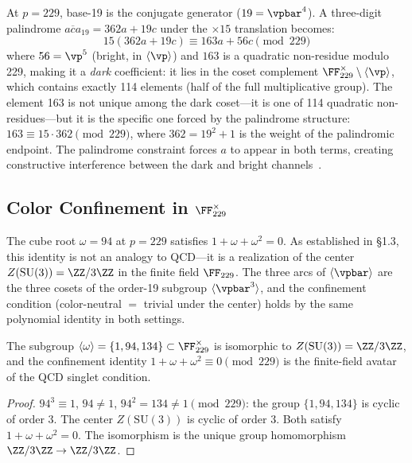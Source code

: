 At $p = 229$, base-19 is the conjugate generator ($19 = \vpbar^4$). A three-digit palindrome $\overline{aca}_{19} = 362a + 19c$ under the $\times 15$ translation becomes:
\[
15(362a + 19c) \equiv 163a + 56c \pmod{229}
\]
where $56 = \vp^5$ (bright, in $\langle \vp \rangle$) and $163$ is a quadratic non-residue modulo 229, making it a \emph{dark} coefficient: it lies in the coset complement $\FF_{229}^\times \setminus \langle \vp \rangle$, which contains exactly 114 elements (half of the full multiplicative group). The element 163 is not unique among the dark coset---it is one of 114 quadratic non-residues---but it is the specific one forced by the palindrome structure: $163 \equiv 15 \cdot 362 \pmod{229}$, where $362 = 19^2 + 1$ is the weight of the palindromic endpoint. The palindrome constraint forces $a$ to appear in both terms, creating constructive interference between the dark and bright channels~\cite{larue_chromatic}.

\subsection{Color Confinement in $\FF_{229}^\times$}

The cube root $\omega = 94$ at $p = 229$ satisfies $1 + \omega + \omega^2 = 0$. As established in \S1.3, this identity is not an analogy to QCD---it is a realization of the center $Z(\mathrm{SU}(3)) = \ZZ/3\ZZ$ in the finite field $\FF_{229}$. The three arcs of $\langle \vpbar \rangle$ are the three cosets of the order-19 subgroup $\langle \vpbar^3 \rangle$, and the confinement condition (color-neutral $=$ trivial under the center) holds by the same polynomial identity in both settings.

\begin{theorem}[Center Realization at $p = 229$]\label{thm:center_229}
The subgroup $\langle \omega \rangle = \{1, 94, 134\} \subset \FF_{229}^\times$ is isomorphic to $Z(\mathrm{SU}(3)) = \ZZ/3\ZZ$, and the confinement identity $1 + \omega + \omega^2 \equiv 0 \pmod{229}$ is the finite-field avatar of the QCD singlet condition.
\end{theorem}

\begin{proof}
$94^3 \equiv 1$, $94 \neq 1$, $94^2 = 134 \neq 1 \pmod{229}$: the group $\{1, 94, 134\}$ is cyclic of order 3. The center $Z(\mathrm{SU}(3))$ is cyclic of order 3. Both satisfy $1 + \omega + \omega^2 = 0$. The isomorphism is the unique group homomorphism $\ZZ/3\ZZ \to \ZZ/3\ZZ$. \qedhere
\end{proof}

